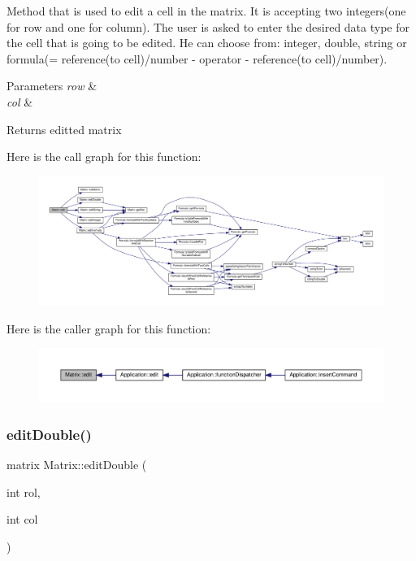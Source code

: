 Method that is used to edit a cell in the matrix. It is accepting two integers(one for row and one for column). The user is asked to enter the desired data type for the cell that is going to be edited. He can choose from\+: integer, double, string or formula(= reference(to cell)/number -\/ operator -\/ reference(to cell)/number). 
\begin{DoxyParams}{Parameters}
{\em row} & \\
\hline
{\em col} & \\
\hline
\end{DoxyParams}
\begin{DoxyReturn}{Returns}
editted matrix 
\end{DoxyReturn}
Here is the call graph for this function\+:
\nopagebreak
\begin{figure}[H]
\begin{center}
\leavevmode
\includegraphics[width=350pt]{class_matrix_a34b2269a2b6d06c202439de2e64009ba_cgraph}
\end{center}
\end{figure}
Here is the caller graph for this function\+:\nopagebreak
\begin{figure}[H]
\begin{center}
\leavevmode
\includegraphics[width=350pt]{class_matrix_a34b2269a2b6d06c202439de2e64009ba_icgraph}
\end{center}
\end{figure}
\mbox{\label{class_matrix_a147d3813e96ef757fb0d5ff65e5f97ef}} 
\subsubsection{\texorpdfstring{edit\+Double()}{editDouble()}}
{\footnotesize\ttfamily matrix Matrix\+::edit\+Double (\begin{DoxyParamCaption}\item[{int}]{rol,  }\item[{int}]{col }\end{DoxyParamCaption})\hspace{0.3cm}{\ttfamily [private]}}

